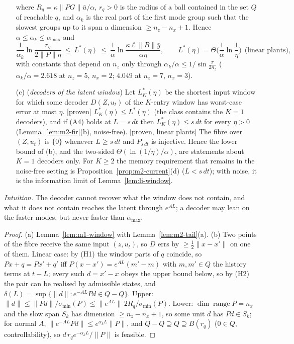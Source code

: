 \begin{theorem}
\begin{enumerate}
\[\]
where $R_q=\kappa\|PG\|\bar u/\alpha$, $r_q>0$ is the radius of a ball contained in the set $Q$ of reachable $q$,
and $\alpha_k$ is the real part of the first mode group such that the slowest groups up to it span a dimension
$\ge n_z-n_x+1$. Hence $\alpha\le\alpha_k\le\alpha_{\max}$ and
\[
 \frac1{\alpha_k}\ln\frac{r_q}{2\|P\|\eta}\ \le\ L^*(\eta)\ \le\ \frac1\alpha\ln\frac{\kappa\ell\|B\|\bar y}{\alpha\eta},
 \qquad L^*(\eta)=\Theta\!\Big(\frac1\alpha\ln\frac1\eta\Big)\ \ \text{(linear plants)},
\]
with constants that depend on $n_z$ only through $\alpha_k/\alpha\le1/\sin\frac{\pi}{2n_z}$ ($\alpha_k/\alpha=2.618$ at
$n_z=5$, $n_x=2$; $4.049$ at $n_z=7$, $n_x=3$).
\item[(c)] (\emph{decoders of the latent window})  Let
$L^*_K(\eta)$ be the shortest input window for which some decoder $D(Z,u_t)$ of the $K$-entry window has worst-case
error at most $\eta$. [proven] $L^*_K(\eta)\le L^*(\eta)$ (the class contains the $K=1$ decoders), and if (A4) holds at
$L=s\,dt$ then $L^*_K(\eta)\le s\,dt$ for every $\eta>0$ (Lemma~\ref{lem:m2-fir}(b), noise-free). [proven, linear plants]
The fibre over $(Z,u_t)$ is $\{0\}$ whenever $L\ge s\,dt$ and $P_{s\,dt}$ is injective. Hence the lower bound of (b),
and the two-sided $\Theta(\ln(1/\eta)/\alpha)$, are statements about $K=1$ decoders only. For $K\ge2$ the memory
requirement that remains in the noise-free setting is Proposition~\ref{prop:m2-current}(d) ($L<s\,dt$); with noise, it
is the information limit of Lemma~\ref{lem:li-window}.
\end{enumerate}
\end{theorem}
\emph{Intuition.} The decoder cannot recover what the window does not contain, and what it does not contain
reaches the latent through $e^{AL}$; a decoder may lean on the faster modes, but never faster than $\alpha_{\max}$.
\begin{proof}
(a) Lemma~\ref{lem:m1-window} with Lemma~\ref{lem:m2-tail}(a). (b) Two points of the fibre receive the same
input $(z,u_t)$, so $D$ errs by $\ge\frac12\|x-x'\|$ on one of them. Linear case: by (H1) the window parts of $q$
coincide, so $Px+q=Px'+q'$ iff $P(x-x')=e^{AL}(m'-m)$ with $m,m'\in Q$ the history terms at $t-L$; every such $d=x'-x$
obeys the upper bound below, so by (H2) the pair can be realised by admissible states, and $\delta(L)=\sup\{\|d\|:e^{-AL}Pd\in Q-Q\}$. Upper:
$\|d\|\le\|Pd\|/\sigma_{\min}(P)\le\|e^{AL}\|\,2R_q/\sigma_{\min}(P)$. Lower: $\dim\operatorname{range}P=n_x$ and
the slow span $S_k$ has dimension $\ge n_z-n_x+1$, so some unit $d$ has $Pd\in S_k$; for normal $A$,
$\|e^{-AL}Pd\|\le e^{\alpha_kL}\|P\|$, and $Q-Q\supseteq Q\supseteq B(r_q)$ ($0\in Q$, controllability), so
$d\,r_qe^{-\alpha_kL}/\|P\|$ is feasible.
\end{proof}
